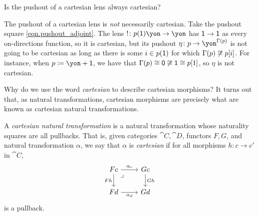 \documentclass[Book-Poly]{subfiles}
\begin{document}
\begin{exercise}
Is the pushout of a cartesian lens always cartesian?
\begin{solution}
The pushout of a cartesian lens is \emph{not} necessarily cartesian.
Take the pushout square \eqref{eqn.pushout_adjoint}.
The lens $!\colon p(\1)\yon\to\yon$ has $\textsf{1}\to\textsf{1}$ as every on-directions function, so it is cartesian, but its pushout $\eta\colon p\to\yon^{\Gamma(p)}$ is not going to be cartesian as long as there is some $i\in p(\textsf{1})$ for which $\Gamma(p)\not\cong p[i]$.
For instance, when $p\coloneqq\yon+\1$, we have that $\Gamma(p)\cong\textsf{0}\not\cong\textsf{1}\cong p[1]$, so $\eta$ is not cartesian.
\end{solution}
\end{exercise}

Why do we use the word \emph{cartesian} to describe cartesian morphisms? It turns out that, as natural transformations, cartesian morphisms are precisely what are known as cartesian natural transformations.


\begin{definition} \label{def.cart_nat_trans}
A \emph{cartesian natural transformation} is a natural transformation whose naturality squares are all pullbacks.
That is, given categories $\cat{C},\cat{D}$, functors $F,G$, and natural transformation $\alpha$, we say that $\alpha$ is \emph{cartesian} if for all morphisms $h\colon c\to c'$ in $\cat{C}$,
\[
\begin{tikzcd}
    Fc \ar[d, "Fh"'] \ar[r, "\alpha_c"] & Gc \ar[d, "Gh"] \\
    Fd \ar[r, "\alpha_d"'] & Gd \ar[ul, phantom, very near end, "\lrcorner"]
\end{tikzcd}
\]
is a pullback.
\end{definition}
\end{document}
